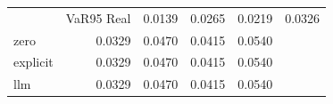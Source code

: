 \begin{tabular}{lrrrr}
\toprule
 & VaR95%
\midrule
Real & 0.0139 & 0.0265 & 0.0219 & 0.0326 \\
zero & 0.0329 & 0.0470 & 0.0415 & 0.0540 \\
explicit & 0.0329 & 0.0470 & 0.0415 & 0.0540 \\
llm & 0.0329 & 0.0470 & 0.0415 & 0.0540 \\
\bottomrule
\end{tabular}
